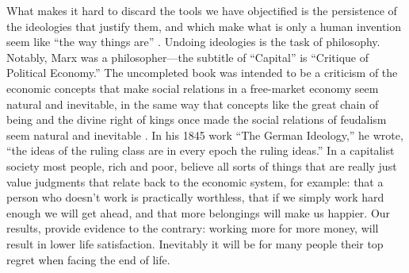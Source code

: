 \documentclass[10pt, letterpaper]{article}
\newcommand{\emd}[1]{\ExecuteMetaData[/tmp/tex]{#1}} %
\begin{document}
\begin{spacing}{1.8}
What makes it hard to discard the tools we have objectified is the persistence
of the ideologies that justify them, and which make what is only a human
invention seem like ``the way things are'' \citep{menandMISC16oct3}.  Undoing
ideologies is the task of philosophy. Notably, Marx was a philosopher---the
subtitle of ``Capital'' is ``Critique of Political Economy.'' The uncompleted
book was intended to be a criticism of the economic concepts that make social
relations in a free-market economy seem natural and inevitable, in the same way
that concepts like the great chain of being and the divine right of kings once
made the social relations of feudalism seem natural and inevitable \citep{menandMISC16oct3}. 
%
In his 1845 work ``The German Ideology,'' he wrote, ``the ideas of the ruling class are in every epoch the ruling ideas.''
In a capitalist society most people, rich and poor, believe all sorts of things
that are really just value judgments that relate back to the economic system,
for example: that a person who doesn't work is practically worthless, that if we
simply work hard enough we will get ahead, and that more belongings will make us
happier. Our results, provide evidence to the contrary: working more for more
money, will result in lower life satisfaction. Inevitably it will be for many people their top regret when facing the end of life. 










\end{spacing}
\end{document}

